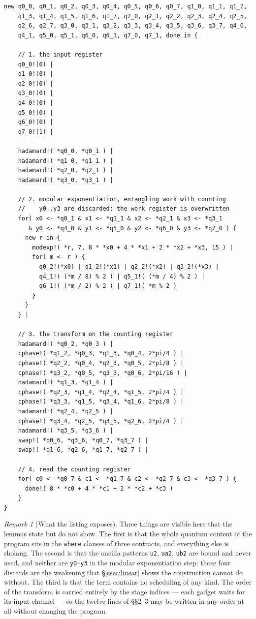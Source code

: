 \documentclass[11pt,a4paper]{article}
\theoremstyle{plain}
\theoremstyle{definition}
\theoremstyle{remark}
\newtheorem{remark}[theorem]{Remark}
\begin{document}
\begin{lstlisting}
new q0_0, q0_1, q0_2, q0_3, q0_4, q0_5, q0_6, q0_7, q1_0, q1_1, q1_2,
    q1_3, q1_4, q1_5, q1_6, q1_7, q2_0, q2_1, q2_2, q2_3, q2_4, q2_5,
    q2_6, q2_7, q3_0, q3_1, q3_2, q3_3, q3_4, q3_5, q3_6, q3_7, q4_0,
    q4_1, q5_0, q5_1, q6_0, q6_1, q7_0, q7_1, done in {

    // 1. the input register
    q0_0!(0) |
    q1_0!(0) |
    q2_0!(0) |
    q3_0!(0) |
    q4_0!(0) |
    q5_0!(0) |
    q6_0!(0) |
    q7_0!(1) |

    hadamard!( *q0_0, *q0_1 ) |
    hadamard!( *q1_0, *q1_1 ) |
    hadamard!( *q2_0, *q2_1 ) |
    hadamard!( *q3_0, *q3_1 ) |

    // 2. modular exponentiation, entangling work with counting
    //    y0..y3 are discarded: the work register is overwritten
    for( x0 <- *q0_1 & x1 <- *q1_1 & x2 <- *q2_1 & x3 <- *q3_1
       & y0 <- *q4_0 & y1 <- *q5_0 & y2 <- *q6_0 & y3 <- *q7_0 ) {
      new r in {
        modexp!( *r, 7, 8 * *x0 + 4 * *x1 + 2 * *x2 + *x3, 15 ) |
        for( m <- r ) {
          q0_2!(*x0) | q1_2!(*x1) | q2_2!(*x2) | q3_2!(*x3) |
          q4_1!( (*m / 8) % 2 ) | q5_1!( (*m / 4) % 2 ) |
          q6_1!( (*m / 2) % 2 ) | q7_1!( *m % 2 )
        }
      }
    } |

    // 3. the transform on the counting register
    hadamard!( *q0_2, *q0_3 ) |
    cphase!( *q1_2, *q0_3, *q1_3, *q0_4, 2*pi/4 ) |
    cphase!( *q2_2, *q0_4, *q2_3, *q0_5, 2*pi/8 ) |
    cphase!( *q3_2, *q0_5, *q3_3, *q0_6, 2*pi/16 ) |
    hadamard!( *q1_3, *q1_4 ) |
    cphase!( *q2_3, *q1_4, *q2_4, *q1_5, 2*pi/4 ) |
    cphase!( *q3_3, *q1_5, *q3_4, *q1_6, 2*pi/8 ) |
    hadamard!( *q2_4, *q2_5 ) |
    cphase!( *q3_4, *q2_5, *q3_5, *q2_6, 2*pi/4 ) |
    hadamard!( *q3_5, *q3_6 ) |
    swap!( *q0_6, *q3_6, *q0_7, *q3_7 ) |
    swap!( *q1_6, *q2_6, *q1_7, *q2_7 ) |

    // 4. read the counting register
    for( c0 <- *q0_7 & c1 <- *q1_7 & c2 <- *q2_7 & c3 <- *q3_7 ) {
      done!( 8 * *c0 + 4 * *c1 + 2 * *c2 + *c3 )
    }
}
\end{lstlisting}

\begin{remark}[What the listing exposes]\label{rem:listing}
Three things are visible here that the lemmas state but do not show. The first
is that the whole quantum content of the program sits in the \texttt{where}
clauses of three contracts, and everything else is rholang. The second is that
the ancilla patterns \texttt{u2}, \texttt{ua2}, \texttt{ub2} are bound and never
used, and neither are \texttt{y0}--\texttt{y3} in the modular exponentiation
step; those four discards are the weakening that \S\ref{ssec:linear} shows the
construction cannot do without. The third is that the term contains no
scheduling of any kind. The order of the transform is carried entirely by the
stage indices --- each gadget waits for its input channel --- so the twelve
lines of \S\S2--3 may be written in any order at all without changing the
program.
\end{remark}
\end{document}
